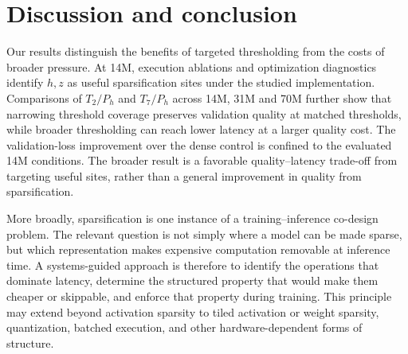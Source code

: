 \section{Discussion and conclusion}
\label{sec:conclusion}

Our results distinguish the benefits of targeted thresholding from the costs of broader pressure. At 14M, execution ablations and optimization diagnostics identify $h,z$ as useful sparsification sites under the studied implementation. Comparisons of $T_2/P_h$ and $T_7/P_h$ across 14M, 31M and 70M further show that narrowing threshold coverage preserves validation quality at matched thresholds, while broader thresholding can reach lower latency at a larger quality cost. The validation-loss improvement over the dense control is confined to the evaluated 14M conditions. The broader result is a favorable quality--latency trade-off from targeting useful sites, rather than a general improvement in quality from sparsification.

More broadly, sparsification is one instance of a training--inference co-design problem. The relevant question is not simply where a model can be made sparse, but which representation makes expensive computation removable at inference time. A systems-guided approach is therefore to identify the operations that dominate latency, determine the structured property that would make them cheaper or skippable, and enforce that property during training. This principle may extend beyond activation sparsity to tiled activation or weight sparsity, quantization, batched execution, and other hardware-dependent forms of structure.

